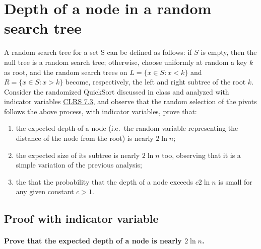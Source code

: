 \section{Depth of a node in a random search tree}

A random search tree for a set S can be defined as follows: if $S$ is empty, then
the null tree is a random search tree; otherwise, choose uniformly at random a key
$k$ as root, and the random search trees on $L = \{x \in S : x < k\}$ and $R = \{x \in S :
x > k\}$ become, respectively, the left and right subtree of the root $k$.
Consider the randomized QuickSort discussed in class and analyzed with indicator
variables \href{http://didawiki.cli.di.unipi.it/lib/exe/fetch.php/magistraleinformatica/alg2/algo2_13/randqs.pdf}{CLRS 7.3},
and observe that the random selection of the pivots follows the above process,
with indicator variables, prove that:
\begin{enumerate}
  \item the expected depth of a node (i.e.\ the random variable representing the distance of the node from the root) is nearly $2 \ln n$;
  \item the expected size of its subtree is nearly $2 \ln n$ too, observing that it is a simple variation of the previous analysis;
  \item the that the probability that the depth of a node exceeds $c2 \ln n$ is small for any given constant $c > 1$.
\end{enumerate}

\subsection{Proof with indicator variable}

\paragraph{Prove that the expected depth of a node is nearly $2 \ln n$.}

